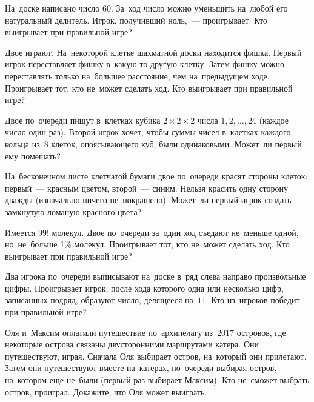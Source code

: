 


\begin{problems}

\item
На~доске написано число $60$.
За~ход число можно уменьшить на~любой его натуральный делитель.
Игрок, получивший ноль,~--- проигрывает.
Кто выигрывает при правильной игре?

\item
Двое играют.
На~некоторой клетке шахматной доски находится фишка.
Первый игрок переставляет фишку в~какую-то другую клетку.
Затем фишку можно переставлять только на~большее расстояние, чем на~предыдущем
ходе.
Проигрывает тот, кто не~может сделать ход.
Кто выигрывает при правильной игре?

\item
Двое по~очереди пишут в~клетках кубика $2 \times 2 \times 2$
числа $1, 2, \ldots, 24$ (каждое число один раз).
Второй игрок хочет, чтобы суммы чисел в~клетках каждого кольца из~$8$ клеток,
опоясывающего куб, были одинаковыми.
Может~ли первый ему помешать?

\item
На~бесконечном листе клетчатой бумаги двое по~очереди красят стороны клеток:
первый~--- красным цветом, второй~--- синим.
Нельзя красить одну сторону дважды (изначально ничего не~покрашено).
Может~ли первый игрок создать замкнутую ломаную красного цвета?

\item
Имеется $99!$ молекул.
Двое по~очереди за~один ход съедают не~меньше одной, но~не~больше 1\% молекул.
Проигрывает тот, кто не~может сделать ход.
Кто выигрывает при правильной игре?

\item
Два игрока по~очереди выписывают на~доске в~ряд слева направо произвольные
цифры.
Проигрывает игрок, после хода которого одна или несколько цифр, записанных
подряд, образуют число, делящееся на~$11$.
Кто из~игроков победит при правильной игре?

\item
Оля и~Максим оплатили путешествие по~архипелагу из~$2017$ островов, где
некоторые острова связаны двусторонними маршрутами катера.
Они путешествуют, играя.
Сначала Оля выбирает остров, на~который они прилетают.
Затем они путешествуют вместе на~катерах, по~очереди выбирая остров, на~котором
еще не~были (первый раз выбирает Максим).
Кто не~сможет выбрать остров, проиграл.
Докажите, что Оля может выиграть.

\end{problems}


